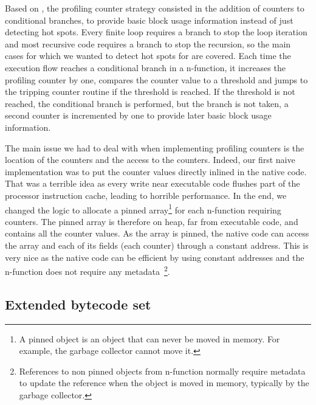 \documentclass[a4paper,12pt,twoside]{../includes/ThesisStyle}
\begin{document}
Based on \cite{Arn02}, the profiling counter strategy consisted in the addition of counters to conditional branches, to provide basic block usage information instead of just detecting hot spots. Every finite loop requires a branch to stop the loop iteration and most recursive code requires a branch to stop the recursion, so the main cases for which we wanted to detect hot spots for are covered. Each time the execution flow reaches a conditional branch in a n-function, it increases the profiling counter by one, compares the counter value to a threshold and jumps to the tripping counter routine if the threshold is reached. If the threshold is not reached, the conditional branch is performed, but the branch is not taken, a second counter is incremented by one to provide later basic block usage information.

The main issue we had to deal with when implementing profiling counters is the location of the counters and the access to the counters. Indeed, our first naive implementation was to put the counter values directly inlined in the native code. That was a terrible idea as every write near executable code flushes part of the processor instruction cache, leading to horrible performance. In the end, we changed the logic to allocate a pinned array\footnote{A pinned object is an object that can never be moved in memory. For example, the garbage collector cannot move it.} for each n-function requiring counters. The pinned array is therefore on heap, far from executable code, and contains all the counter values. As the array is pinned, the native code can access the array and each of its fields (each counter) through a constant address. This is very nice as the native code can be efficient by using constant addresses and the n-function does not require any metadata~\footnote{References to non pinned objects from n-function normally require metadata to update the reference when the object is moved in memory, typically by the garbage collector.}.

\subsection{Extended bytecode set}
\end{document}
